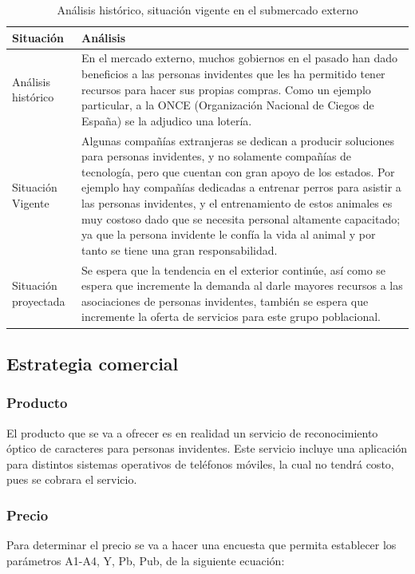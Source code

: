 \documentclass[a4paper, 12pt, oneside]{article}
\begin{document}
	\begin{table}
		\caption{Análisis histórico, situación vigente en el submercado externo}
		\begin{tabular}{ | p{4cm} | p{10cm} | }
		\hline
		Situación & Análisis \\
		\hline					
		Análisis histórico & 
		En el mercado externo, muchos gobiernos en el pasado han dado beneficios a las personas invidentes que les ha permitido tener recursos para hacer sus propias compras. Como un ejemplo particular, a la ONCE (Organización Nacional de Ciegos de España) se la adjudico una lotería. \\
		\hline
		Situación Vigente &
		Algunas compañías extranjeras se dedican a producir soluciones para personas invidentes, y no solamente compañías de tecnología, pero que cuentan con gran apoyo de los estados. Por ejemplo hay compañías dedicadas a entrenar perros para asistir a las personas invidentes, y el entrenamiento de estos animales es muy costoso dado que se necesita personal altamente capacitado; ya que la persona invidente le confía la vida al animal y por tanto se tiene una gran responsabilidad. \\
		\hline
		Situación proyectada &
		Se espera que la tendencia en el exterior continúe, así como se espera que incremente la demanda al darle mayores recursos a las asociaciones de personas invidentes, también se espera que incremente la oferta de servicios para este grupo poblacional. \\
		\hline
		\end{tabular}
		\label{extHistorico}
	\end{table}
		
	\subsection{Estrategia comercial}
	 
	\subsubsection{Producto}
	El producto que se va a ofrecer es en realidad un servicio de reconocimiento óptico de caracteres para personas invidentes. Este servicio incluye una aplicación para distintos
	sistemas operativos de teléfonos móviles, la cual no tendrá costo, pues se cobrara el servicio.

	\subsubsection{Precio}
	Para determinar el precio se va a hacer una encuesta que permita establecer los parámetros A1-A4, Y, Pb, Pub, de la siguiente ecuación:
\end{document}
